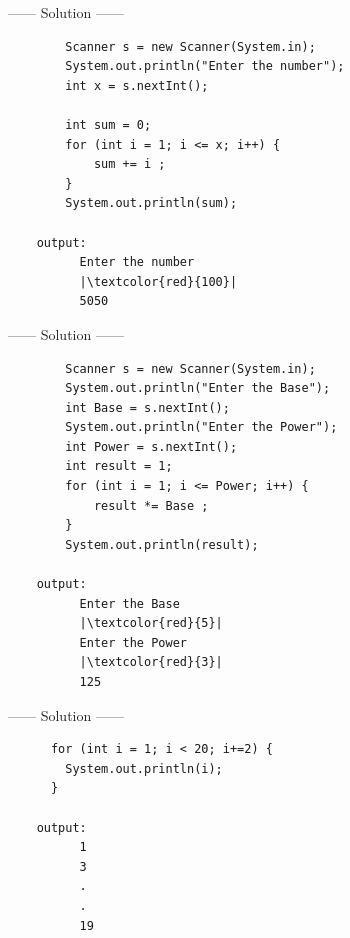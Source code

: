 \begin{minipage}[h]{1\textwidth}
\begin{example}
  \begin{center}
    ------ \textcolor{Solution}{Solution} ------ 
  \end{center} 

  \begin{verbatim}
        Scanner s = new Scanner(System.in);
        System.out.println("Enter the number");
        int x = s.nextInt();
        
        int sum = 0;
        for (int i = 1; i <= x; i++) {
            sum += i ;
        }
        System.out.println(sum);

    output:
          Enter the number
          |\textcolor{red}{100}|
          5050
  \end{verbatim}
\end{example}
\end{minipage}
\newpage
\begin{example}
  \begin{center}
    ------ \textcolor{Solution}{Solution} ------ 
  \end{center} 

  \begin{verbatim}
        Scanner s = new Scanner(System.in);
        System.out.println("Enter the Base");
        int Base = s.nextInt();
        System.out.println("Enter the Power");
        int Power = s.nextInt();
        int result = 1;
        for (int i = 1; i <= Power; i++) {
            result *= Base ;
        }
        System.out.println(result);

    output:
          Enter the Base
          |\textcolor{red}{5}|
          Enter the Power
          |\textcolor{red}{3}|
          125
  \end{verbatim}
\end{example}
\begin{example}
  \begin{center}
    ------ \textcolor{Solution}{Solution} ------ 
  \end{center} 

  \begin{verbatim}
      for (int i = 1; i < 20; i+=2) {
        System.out.println(i);    
      }
        
    output:
          1
          3
          .
          .
          19
  \end{verbatim}
\end{example}

